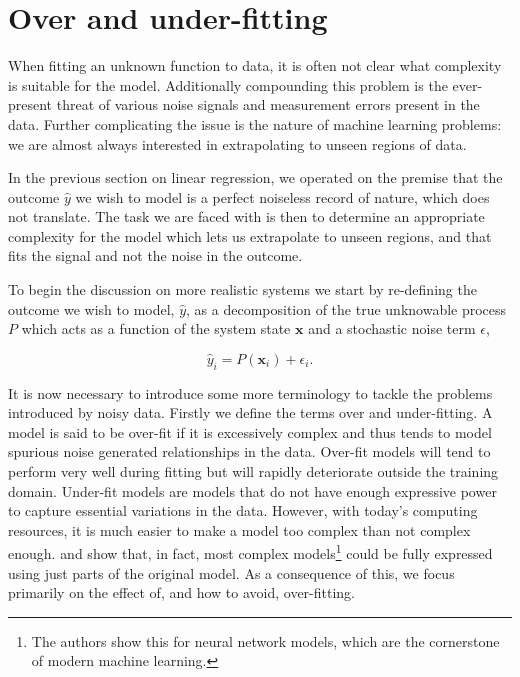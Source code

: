 \section{Over and under-fitting}\label{sec:fitting}

When fitting an unknown function to data, it is often not clear what complexity is suitable for the model. Additionally compounding this problem is the ever-present threat of various noise signals and measurement errors present in the data. Further complicating the issue is the nature of machine learning problems: we are almost always interested in extrapolating to unseen regions of data. 

In the previous section on linear regression, we operated on the premise that the outcome $\hat{y}$ we wish to model is a perfect noiseless record of nature, which does not translate. The task we are faced with is then to determine an appropriate complexity for the model which lets us extrapolate to unseen regions, and that fits the signal and not the noise in the outcome. 

To begin the discussion on more realistic systems we start by re-defining the outcome we wish to model, $\hat{y}$, as a decomposition of the true unknowable process $P$ which acts as a function of the system state $\mathbf{x}$ and a stochastic noise term $\epsilon$, 

\begin{equation}\label{eq:target}
\hat{y}_i = P(\mathbf{x}_i) + \epsilon_i.
\end{equation}

\noindent It is now necessary to introduce some more terminology to tackle the problems introduced by noisy data. Firstly we define the terms over and under-fitting. A model is said to be over-fit if it is excessively complex and thus tends to model spurious noise generated relationships in the data. Over-fit models will tend to perform very well during fitting but will rapidly deteriorate outside the training  domain. Under-fit models are models that do not have enough expressive power to capture essential variations in the data.  However, with today's computing resources, it is much easier to make a model too complex than not complex enough. \citet{Frankle2019} and \citet{Frankle2018} show that, in fact, most complex models\footnote{The authors show this for neural network models, which are the cornerstone of modern machine learning.} could be fully expressed using just parts of the original model. As a consequence of this, we focus primarily on the effect of, and how to avoid, over-fitting.

